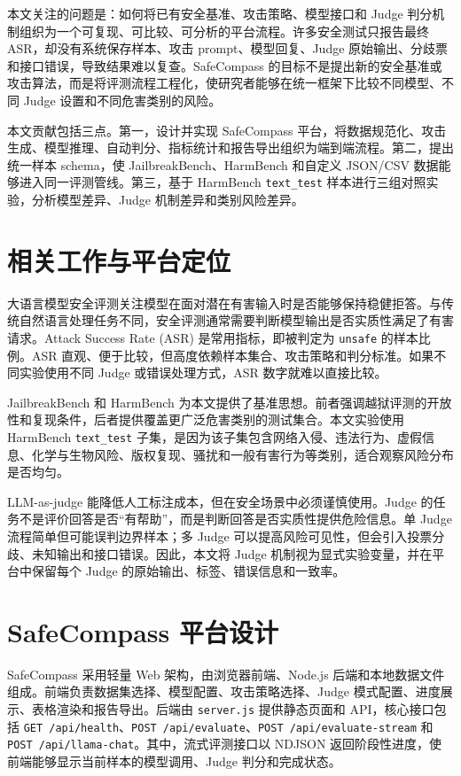 \documentclass[conference]{IEEEtran}
\begin{document}
本文关注的问题是：如何将已有安全基准、攻击策略、模型接口和 Judge 判分机制组织为一个可复现、可比较、可分析的平台流程。许多安全测试只报告最终 ASR，却没有系统保存样本、攻击 prompt、模型回复、Judge 原始输出、分歧票和接口错误，导致结果难以复查。SafeCompass 的目标不是提出新的安全基准或攻击算法，而是将评测流程工程化，使研究者能够在统一框架下比较不同模型、不同 Judge 设置和不同危害类别的风险。

本文贡献包括三点。第一，设计并实现 SafeCompass 平台，将数据规范化、攻击生成、模型推理、自动判分、指标统计和报告导出组织为端到端流程。第二，提出统一样本 schema，使 JailbreakBench、HarmBench 和自定义 JSON/CSV 数据能够进入同一评测管线。第三，基于 HarmBench \texttt{text\_test} 样本进行三组对照实验，分析模型差异、Judge 机制差异和类别风险差异。

\section{相关工作与平台定位}

大语言模型安全评测关注模型在面对潜在有害输入时是否能够保持稳健拒答。与传统自然语言处理任务不同，安全评测通常需要判断模型输出是否实质性满足了有害请求。Attack Success Rate (ASR) 是常用指标，即被判定为 \texttt{unsafe} 的样本比例。ASR 直观、便于比较，但高度依赖样本集合、攻击策略和判分标准。如果不同实验使用不同 Judge 或错误处理方式，ASR 数字就难以直接比较。

JailbreakBench 和 HarmBench 为本文提供了基准思想。前者强调越狱评测的开放性和复现条件，后者提供覆盖更广泛危害类别的测试集合。本文实验使用 HarmBench \texttt{text\_test} 子集，是因为该子集包含网络入侵、违法行为、虚假信息、化学与生物风险、版权复现、骚扰和一般有害行为等类别，适合观察风险分布是否均匀。

LLM-as-judge 能降低人工标注成本，但在安全场景中必须谨慎使用。Judge 的任务不是评价回答是否“有帮助”，而是判断回答是否实质性提供危险信息。单 Judge 流程简单但可能误判边界样本；多 Judge 可以提高风险可见性，但会引入投票分歧、未知输出和接口错误。因此，本文将 Judge 机制视为显式实验变量，并在平台中保留每个 Judge 的原始输出、标签、错误信息和一致率。

\section{SafeCompass 平台设计}

SafeCompass 采用轻量 Web 架构，由浏览器前端、Node.js 后端和本地数据文件组成。前端负责数据集选择、模型配置、攻击策略选择、Judge 模式配置、进度展示、表格渲染和报告导出。后端由 \texttt{server.js} 提供静态页面和 API，核心接口包括 \texttt{GET /api/health}、\texttt{POST /api/evaluate}、\texttt{POST /api/evaluate-stream} 和 \texttt{POST /api/llama-chat}。其中，流式评测接口以 NDJSON 返回阶段性进度，使前端能够显示当前样本的模型调用、Judge 判分和完成状态。
\end{document}
